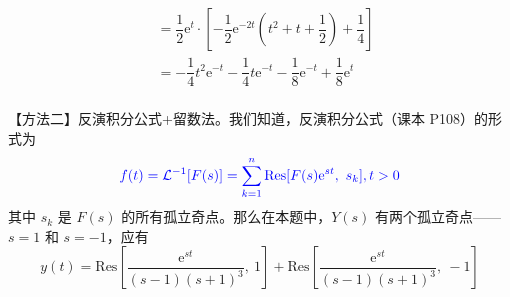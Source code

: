 \documentclass[UTF8]{ctexart}
\newcommand\Emph[1]{\colorbox{red!20!}{\textcolor{red!80!black}{#1}}}
\newcommand\e{\mathrm{e}}
\begin{document}
\newpage
{}
\BgThispage
\phantom{...}
\vspace{0.3cm}
\begin{equation*}
\begin{aligned}
    &= \dfrac12\e^t \cdot \left[-\dfrac12\e^{-2t}\left(t^2 + t + \dfrac12\right) + \dfrac14\right] \\
    &= -\dfrac14 t^2 \e^{-t} - \dfrac14 t\e^{-t} - \dfrac18 \e^{-t} + \dfrac18 \e^t \\
\end{aligned}
\end{equation*}

【方法二】\Emph{反演积分公式+留数法}。我们知道，反演积分公式（课本 P108）的形式为
\begin{equation}\color{blue}
    f(t) = \mathcal{L}^{-1}[F(s)] = \sum_{k=1}^{n}\mathrm{Res}[F(s)\e^{st},\ s_k], t>0 
\end{equation}
其中 $s_k$ 是 $F(s)$ 的所有孤立奇点。那么在本题中，$Y(s)$ 有两个孤立奇点——$s=1$ 和 $s=-1$，应有
\begin{equation*}
    y(t) = \mathrm{Res}\left[\dfrac{\e^{st}}{(s-1)(s+1)^3},\ 1 \right] + \mathrm{Res}\left[\dfrac{\e^{st}}{(s-1)(s+1)^3},\ -1 \right]
\end{equation*}
\end{document}
